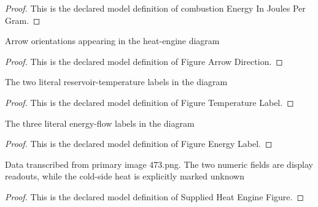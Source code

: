 \begin{proof}
  This is the declared model definition of combustion Energy In Joules Per Gram.
\end{proof}
\begin{definition}
  \label{def:physics:phyx-mini-0473:phyxminiproblems-problemphyxmini0473-figurearrowdirection}
  Arrow orientations appearing in the heat-engine diagram
\end{definition}
\begin{proof}
  This is the declared model definition of Figure Arrow Direction.
\end{proof}
\begin{definition}
  \label{def:physics:phyx-mini-0473:phyxminiproblems-problemphyxmini0473-figuretemperaturelabel}
  The two literal reservoir-temperature labels in the diagram
\end{definition}
\begin{proof}
  This is the declared model definition of Figure Temperature Label.
\end{proof}
\begin{definition}
  \label{def:physics:phyx-mini-0473:phyxminiproblems-problemphyxmini0473-figureenergylabel}
  The three literal energy-flow labels in the diagram
\end{definition}
\begin{proof}
  This is the declared model definition of Figure Energy Label.
\end{proof}
\begin{definition}
  \label{def:physics:phyx-mini-0473:phyxminiproblems-problemphyxmini0473-suppliedheatenginefigure}
  Data transcribed from primary image 473.png. The two numeric fields are display readouts, while the cold-side heat is explicitly marked unknown
\end{definition}
\begin{proof}
  This is the declared model definition of Supplied Heat Engine Figure.
\end{proof}
